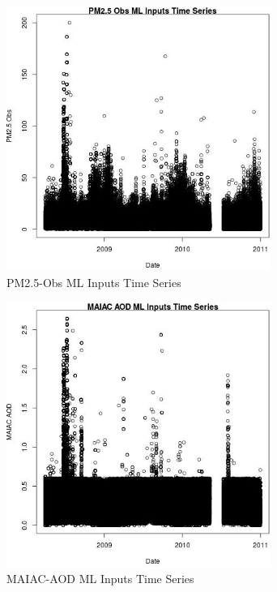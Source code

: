 
\begin{figure} 
\centering  
\includegraphics[width=0.77\textwidth]{Code_Outputs/ML_input_report_ML_input_PM25_Step5_part_d_de_duplicated_aves_ML_inputpdfs_PM25_ObsvDate.jpg} 
\caption{\label{fig:ML_input_report_ML_input_PM25_Step5_part_d_de_duplicated_aves_ML_inputpdfsPM25_ObsvDate}PM2.5-Obs ML Inputs Time Series} 
\end{figure} 
 

\begin{figure} 
\centering  
\includegraphics[width=0.77\textwidth]{Code_Outputs/ML_input_report_ML_input_PM25_Step5_part_d_de_duplicated_aves_ML_inputpdfs_MAIAC_AODvDate.jpg} 
\caption{\label{fig:ML_input_report_ML_input_PM25_Step5_part_d_de_duplicated_aves_ML_inputpdfsMAIAC_AODvDate}MAIAC-AOD ML Inputs Time Series} 
\end{figure} 
 

